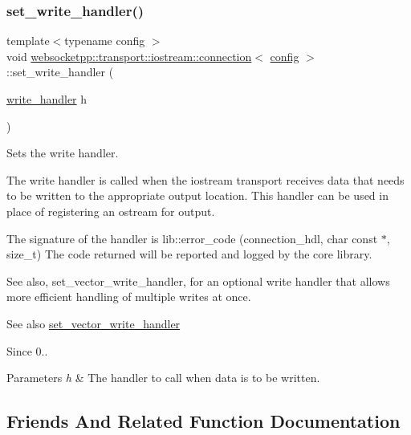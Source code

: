 \subsubsection{\texorpdfstring{set\+\_\+write\+\_\+handler()}{set\_write\_handler()}}
{\footnotesize\ttfamily template$<$typename config $>$ \\
void \mbox{\hyperlink{classwebsocketpp_1_1transport_1_1iostream_1_1connection}{websocketpp\+::transport\+::iostream\+::connection}}$<$ \mbox{\hyperlink{classconfig}{config}} $>$\+::set\+\_\+write\+\_\+handler (\begin{DoxyParamCaption}\item[{\mbox{\hyperlink{namespacewebsocketpp_1_1transport_1_1iostream_abc22b834c2d0c698d6c87e51d5bfad2c}{write\+\_\+handler}}}]{h }\end{DoxyParamCaption})\hspace{0.3cm}{\ttfamily [inline]}}



Sets the write handler. 

The write handler is called when the iostream transport receives data that needs to be written to the appropriate output location. This handler can be used in place of registering an ostream for output.

The signature of the handler is {\ttfamily lib\+::error\+\_\+code (connection\+\_\+hdl, char const $\ast$, size\+\_\+t)} The code returned will be reported and logged by the core library.

See also, set\+\_\+vector\+\_\+write\+\_\+handler, for an optional write handler that allows more efficient handling of multiple writes at once.

\begin{DoxySeeAlso}{See also}
\mbox{\hyperlink{classwebsocketpp_1_1transport_1_1iostream_1_1connection_aa035dc6275c5babb99c0cbada8521b5c}{set\+\_\+vector\+\_\+write\+\_\+handler}}
\end{DoxySeeAlso}
\begin{DoxySince}{Since}
0..
\end{DoxySince}

\begin{DoxyParams}{Parameters}
{\em h} & The handler to call when data is to be written. \\
\hline
\end{DoxyParams}


\subsection{Friends And Related Function Documentation}
\mbox{\label{classwebsocketpp_1_1transport_1_1iostream_1_1connection_abe774d57c24627dd991932f833041987}} 
